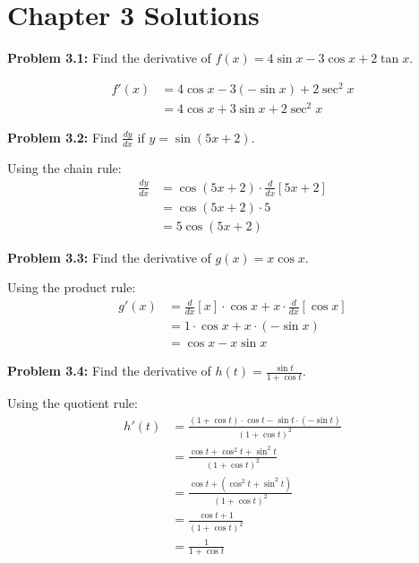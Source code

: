 \documentclass[12pt,a4paper]{book}
\theoremstyle{definition}
\begin{document}
\section*{Chapter 3 Solutions}

\begin{solution}
\textbf{Problem 3.1:} Find the derivative of $f(x) = 4\sin x - 3\cos x + 2\tan x$.

\begin{align}
f'(x) &= 4\cos x - 3(-\sin x) + 2\sec^2 x\\
&= 4\cos x + 3\sin x + 2\sec^2 x
\end{align}
\end{solution}

\begin{solution}
\textbf{Problem 3.2:} Find $\frac{dy}{dx}$ if $y = \sin(5x + 2)$.

Using the chain rule:
\begin{align}
\frac{dy}{dx} &= \cos(5x + 2) \cdot \frac{d}{dx}[5x + 2]\\
&= \cos(5x + 2) \cdot 5\\
&= 5\cos(5x + 2)
\end{align}
\end{solution}

\begin{solution}
\textbf{Problem 3.3:} Find the derivative of $g(x) = x\cos x$.

Using the product rule:
\begin{align}
g'(x) &= \frac{d}{dx}[x] \cdot \cos x + x \cdot \frac{d}{dx}[\cos x]\\
&= 1 \cdot \cos x + x \cdot (-\sin x)\\
&= \cos x - x\sin x
\end{align}
\end{solution}

\begin{solution}
\textbf{Problem 3.4:} Find the derivative of $h(t) = \frac{\sin t}{1 + \cos t}$.

Using the quotient rule:
\begin{align}
h'(t) &= \frac{(1 + \cos t) \cdot \cos t - \sin t \cdot (-\sin t)}{(1 + \cos t)^2}\\
&= \frac{\cos t + \cos^2 t + \sin^2 t}{(1 + \cos t)^2}\\
&= \frac{\cos t + (\cos^2 t + \sin^2 t)}{(1 + \cos t)^2}\\
&= \frac{\cos t + 1}{(1 + \cos t)^2}\\
&= \frac{1}{1 + \cos t}
\end{align}
\end{solution}
\end{document}
